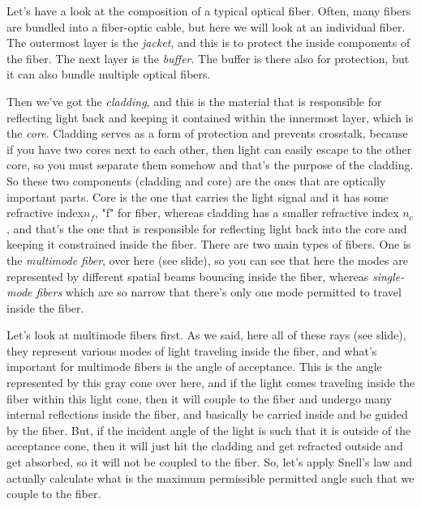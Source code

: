 Let's have a look at the composition of a typical optical fiber.  Often, many fibers are bundled into a fiber-optic cable, but here we will look at an individual fiber.  The outermost layer is the \emph{jacket}, and this is to protect the inside components of the fiber. The next layer is the \emph{buffer}. The buffer is there also for protection, but it can also bundle multiple optical fibers.

Then we've got the \emph{cladding}, and this is the material that is responsible for reflecting light back and keeping it contained within the innermost layer, which is the \emph{core}. Cladding serves as a form of protection and prevents crosstalk, because if you have two cores next to each other, then light can easily escape to the other core, so you must separate them somehow and that's the purpose of the cladding. So these two components (cladding and core) are the ones that are optically important parts. Core is the one that carries the light signal and it has some refractive index$n_f$, "f" for fiber, whereas cladding has a smaller refractive index $n_c$, and that's the one that is responsible for reflecting light back into the core and keeping it constrained inside the fiber. There are two main types of fibers. One is the \emph{multimode fiber}, over here (see slide), so you can see that here the modes are represented by different spatial beams bouncing inside the fiber,  whereas \emph{single-mode fibers} which are so narrow that there's only one mode permitted to travel inside the fiber.

Let's look at multimode fibers first. As we said, here all of these rays (see slide), they represent various modes of light traveling inside the fiber, and what's important for multimode fibers is the angle of acceptance. This is the angle represented by this gray cone over here, and if the light comes traveling inside the fiber within this light cone, then it will couple to the fiber and undergo many internal reflections inside the fiber, and basically be carried inside and be guided by the fiber. But, if the incident angle of the light is such that it is outside of the acceptance cone, then it will just hit the cladding and get refracted outside and get absorbed, so it will not be coupled to the fiber. So, let's apply Snell's law and actually calculate what is the maximum permissible permitted angle such that we couple to the fiber.

